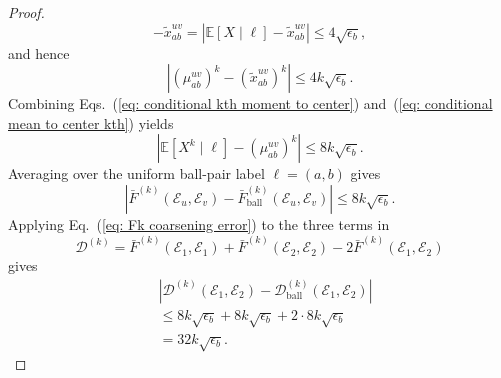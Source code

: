 \documentclass[aps,prx,reprint,superscriptaddress,amsmath,amssymb,longbibliography,floatfix]{revtex4-2}
\newcommand{\Abs}[1]{\left\lvert #1\right\rvert}
\newcommand{\dsE}{\mathbb{E}}
\newcommand{\scD}{\mathcal{D}}
\newcommand{\scE}{\mathcal{E}}
\theoremstyle{plain}
\theoremstyle{definition}
\theoremstyle{remark}
\begin{document}
\begin{proof}
\begin{equation}
{            -
            \widetilde{x}_{ab}^{uv}
        }
        =
        \Abs{
            \dsE[X\mid \ell]
            -
            \widetilde{x}_{ab}^{uv}
        }
        \le
        4\sqrt{\epsilon_b},
    \end{equation}
    and hence
    \begin{equation}
        \Abs{
            (\mu_{ab}^{uv})^k
            -
            (\widetilde{x}_{ab}^{uv})^k
        }
        \le
        4k\sqrt{\epsilon_b}.
        \label{eq: conditional mean to center kth}
    \end{equation}
    Combining Eqs.~(\ref{eq: conditional kth moment to center}) and~(\ref{eq: conditional mean to center kth}) yields
    \begin{equation}
        \Abs{
            \dsE[X^k\mid \ell]
            -
            (\mu_{ab}^{uv})^k
        }
        \le
        8k\sqrt{\epsilon_b}.
    \end{equation}
    Averaging over the uniform ball-pair label $\ell=(a,b)$ gives
    \begin{equation}
        \Abs{
            \bar F^{(k)}(\scE_u,\scE_v)
            -
            \bar F^{(k)}_{\mathrm{ball}}(\scE_u,\scE_v)
        }
        \le
        8k\sqrt{\epsilon_b}.
        \label{eq: Fk coarsening error}
    \end{equation}
    Applying Eq.~(\ref{eq: Fk coarsening error}) to the three terms in
    \[
        \scD^{(k)}
        =
        \bar F^{(k)}(\scE_1,\scE_1)
        +
        \bar F^{(k)}(\scE_2,\scE_2)
        -
        2\bar F^{(k)}(\scE_1,\scE_2)
    \]
    gives
    \begin{equation}
\begin{aligned}
&\Abs{
            \scD^{(k)}(\scE_1,\scE_2)
            -
            \scD^{(k)}_{\mathrm{ball}}(\scE_1,\scE_2)
        }\\
        &\le
        8k\sqrt{\epsilon_b}
        +
        8k\sqrt{\epsilon_b}
        +
        2\cdot 8k\sqrt{\epsilon_b}\\
        &=
        32k\sqrt{\epsilon_b}.
\end{aligned}
\end{equation}
\end{proof}
\end{document}

